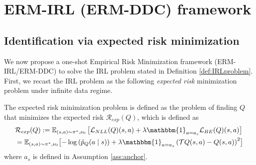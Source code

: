 \section{ERM-IRL (ERM-DDC) framework}\label{sec:ERM-IRL}
\subsection{Identification via expected risk minimization}



We now propose a one-shot Empirical Risk Minimization framework (ERM-IRL/ERM-DDC) to solve the IRL problem stated in Definition \ref{def:IRLproblem}. First, we recast the IRL problem as the following \textit{expected risk} minimization problem under infinite data regime.

\begin{defn} The expected risk minimization problem is defined as the problem of finding $Q$ that minimizes  the expected risk $\mathcal{R}_{exp}(Q)$, which is defined as
\begin{align}
  &\mathcal{R}_{exp}(Q):= \mathbb{E}_{(s, a)\sim \pi^*, \nu_0}  \left[\mathcal{L}_{NLL}(Q)(s,a) + \lambda \mathbbm{1}_{a = a_s} \mathcal{L}_{BE}(Q)(s,a)\right] \! \notag \noindent
  \\
  & = \mathbb{E}_{(s, a)\sim \pi^*, \nu_0}\bigl[-\log\left(\hat{p}_{Q}(a
\mid s)\right) +  \lambda \mathbbm{1}_{a = a_s} \left( \mathcal{T}Q(s, a) - Q(s, a) \right)^2 \bigr] \label{eq:mainopt}
\end{align}
\noindent where $a_s$ is defined in Assumption \ref{ass:anchor}.
\end{defn}


